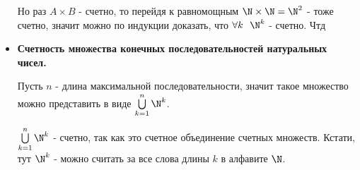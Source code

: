 \begin{itemize}
Но раз $A \times B$ - счетно, то перейдя к равномощным $\N \times \N = \N^2$ - тоже счетно, значит можно по индукции доказать,
что $\forall k \ \ \N^k$ - счетно. Чтд\\

\item \textbf{Счетность множества конечных последовательностей натуральных чисел.}

Пусть $n$ - длина максимальной последовательности, значит такое множество можно представить в виде $\bigcup\limits_{k = 1}^{n} \N^k$.

$\bigcup\limits_{k = 1}^{n} \N^k$ - счетно, так как это счетное объединение счетных множеств. Кстати, тут
$\N^k$ - можно считать за все слова длины $k$ в алфавите $\N$.

\end{itemize}